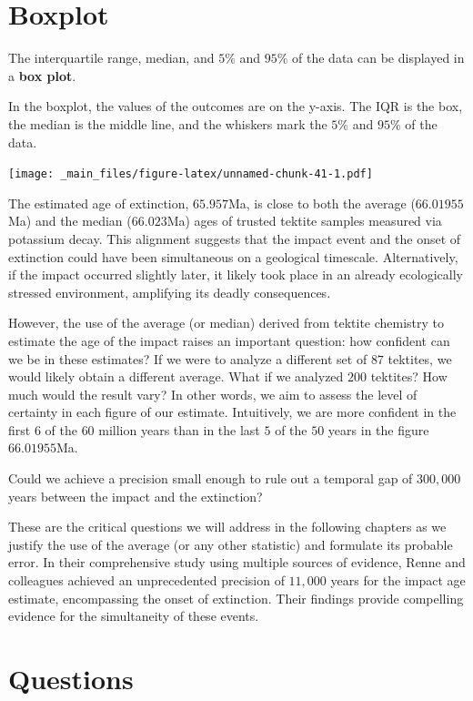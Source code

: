 \documentclass[
]{book}
\begin{document}
\hypertarget{boxplot}{%
\section{Boxplot}\label{boxplot}}

The interquartile range, median, and \(5\%\) and \(95\%\) of the data can be displayed in a \textbf{box plot}.

In the boxplot, the values of the outcomes are on the y-axis. The IQR is the box, the median is the middle line, and the whiskers mark the \(5\%\) and \(95\%\) of the data.

\texttt{[image: \_main\_files/figure-latex/unnamed-chunk-41-1.pdf]}

The estimated age of extinction, \(65.957\)Ma, is close to both the average (\(66.01955\)Ma) and the median (\(66.023\)Ma) ages of trusted tektite samples measured via potassium decay. This alignment suggests that the impact event and the onset of extinction could have been simultaneous on a geological timescale. Alternatively, if the impact occurred slightly later, it likely took place in an already ecologically stressed environment, amplifying its deadly consequences.

However, the use of the average (or median) derived from tektite chemistry to estimate the age of the impact raises an important question: how confident can we be in these estimates? If we were to analyze a different set of \(87\) tektites, we would likely obtain a different average. What if we analyzed \(200\) tektites? How much would the result vary? In other words, we aim to assess the level of certainty in each figure of our estimate. Intuitively, we are more confident in the first \(6\) of the \(60\) million years than in the last \(5\) of the \(50\) years in the figure \(66.01955\)Ma.

Could we achieve a precision small enough to rule out a temporal gap of \(300,000\) years between the impact and the extinction?

These are the critical questions we will address in the following chapters as we justify the use of the average (or any other statistic) and formulate its probable error. In their comprehensive study using multiple sources of evidence, Renne and colleagues achieved an unprecedented precision of \(11,000\) years for the impact age estimate, encompassing the onset of extinction. Their findings provide compelling evidence for the simultaneity of these events.

\hypertarget{questions}{%
\section{Questions}\label{questions}}
\end{document}
